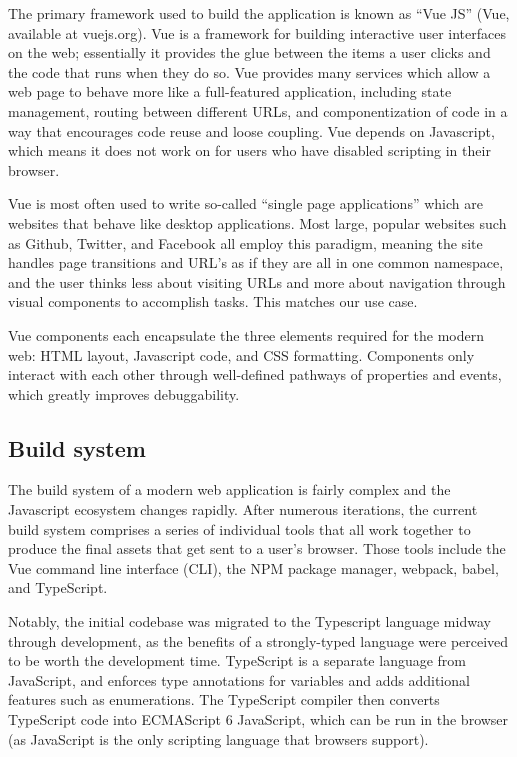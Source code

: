 The primary framework used to build the application is known as ``Vue JS'' (Vue, available at vuejs.org). Vue is a framework for building interactive user interfaces on the web; essentially it provides the glue between the items a user clicks and the code that runs when they do so. Vue provides many services which allow a web page to behave more like a full-featured application, including state management, routing between different URLs, and componentization of code in a way that encourages code reuse and loose coupling. Vue depends on Javascript, which means it does not work on for users who have disabled scripting in their browser.

Vue is most often used to write so-called ``single page applications'' which are websites that behave like desktop applications. Most large, popular websites such as Github, Twitter, and Facebook all employ this paradigm, meaning the site handles page transitions and URL's as if they are all in one common namespace, and the user thinks less about visiting URLs and more about navigation through visual components to accomplish tasks. This matches our use case.

Vue components each encapsulate the three elements required for the modern web: HTML layout, Javascript code, and CSS formatting. Components only interact with each other through well-defined pathways of properties and events, which greatly improves debuggability.

\hypertarget{build-system}{%
\subsection{Build system}\label{build-system}}

The build system of a modern web application is fairly complex and the Javascript ecosystem changes rapidly. After numerous iterations, the current build system comprises a series of individual tools that all work together to produce the final assets that get sent to a user's browser. Those tools include the Vue command line interface (CLI), the NPM package manager, webpack, babel, and TypeScript.

Notably, the initial codebase was migrated to the Typescript language midway through development, as the benefits of a strongly-typed language were perceived to be worth the development time. TypeScript is a separate language from JavaScript, and enforces type annotations for variables and adds additional features such as enumerations. The TypeScript compiler then converts TypeScript code into ECMAScript 6 JavaScript, which can be run in the browser (as JavaScript is the only scripting language that browsers support).

